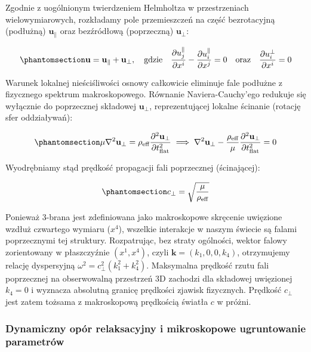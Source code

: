 \documentclass[
  polish,
  letterpaper,
  DIV=11,
  numbers=noendperiod,
  oneside]{scrartcl}
\begin{document}
Zgodnie z uogólnionym twierdzeniem Helmholtza w przestrzeniach
wielowymiarowych, rozkładamy pole przemieszczeń na część bezrotacyjną
(podłużną) \(\mathbf{u}_\parallel\) oraz bezźródłową (poprzeczną)
\(\mathbf{u}_\perp\):

\begin{equation}\protect\phantomsection\label{eq-sek131-pole-wekt}{\mathbf{u} = \mathbf{u}_\parallel + \mathbf{u}_\perp, \quad \text{gdzie} \quad \frac{\partial u_j^\parallel}{\partial x^i} - \frac{\partial u_i^\parallel}{\partial x^j} = 0 \quad \text{oraz} \quad \frac{\partial u_i^\perp}{\partial x^i} = 0}\end{equation}

Warunek lokalnej nieściśliwości osnowy całkowicie eliminuje fale
podłużne z fizycznego spektrum makroskopowego. Równanie
Naviera-Cauchy'ego redukuje się wyłącznie do poprzecznej składowej
\(\mathbf{u}_\perp\), reprezentującej lokalne ścinanie (rotację sfer
oddziaływań):

\begin{equation}\protect\phantomsection\label{eq-sek131-redukc-rownNC}{\mu \nabla^2 \mathbf{u}_\perp = \rho_{\text{eff}} \frac{\partial^2 \mathbf{u}_\perp}{\partial t_{\text{flat}}^2} \implies \nabla^2 \mathbf{u}_\perp - \frac{\rho_{\text{eff}}}{\mu} \frac{\partial^2 \mathbf{u}_\perp}{\partial t_{\text{flat}}^2} = 0}\end{equation}

Wyodrębniamy stąd prędkość propagacji fali poprzecznej (ścinającej):

\begin{equation}\protect\phantomsection\label{eq-sek131-propag-fali-poprzecznej}{c_{\perp} = \sqrt{\frac{\mu}{\rho_{\text{eff}}}}}\end{equation}

Ponieważ 3-brana jest zdefiniowana jako makroskopowe skręcenie uwięzione
wzdłuż czwartego wymiaru (\(x^4\)), wszelkie interakcje w naszym świecie
są falami poprzecznymi tej struktury. Rozpatrując, bez straty ogólności,
wektor falowy zorientowany w płaszczyźnie \((x^1, x^4)\), czyli
\(\mathbf{k} = (k_1, 0, 0, k_4)\), otrzymujemy relację dyspersyjną
\(\omega^2 = c_{\perp}^2 (k_1^2 + k_4^2)\). Maksymalna prędkość rzutu
fali poprzecznej na obserwowalną przestrzeń 3D zachodzi dla składowej
uwięzionej \(k_4 = 0\) i wyznacza absolutną granicę prędkości zjawisk
fizycznych. Prędkość \(c_{\perp}\) jest zatem tożsama z makroskopową
prędkością światła \(c\) w próżni.

\subsubsection{Dynamiczny opór relaksacyjny i mikroskopowe ugruntowanie
parametrów}\label{sec-1-3-2}
\end{document}
